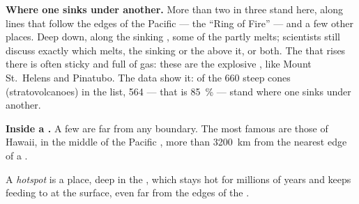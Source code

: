 \textbf{Where one  sinks under another.} More than two  in
three stand here, along lines that follow the edges of the Pacific 
--- the ``Ring of Fire'' --- and a few other places. Deep down, along the
sinking , some of the  partly melts; scientists still discuss
exactly which  melts, the sinking  or the  above it, or both.
The  that rises there is often sticky and full of gas: these are the
explosive , like Mount St.~Helens and Pinatubo. The data show it:
of the 660 steep cones (stratovolcanoes) in the list, 564 --- that is
85~\% --- stand where one  sinks under another.

\textbf{Inside a .} A few  are far from any boundary. The
most famous are those of Hawaii, in the middle of the Pacific , more
than \qty{3200}{km} from the nearest edge of a .

\begin{definition}[Hotspot]\label{def:g7:volcanoes:hotspot}
A \emph{hotspot} is a place, deep in the , which
stays hot for millions of years and keeps feeding  to  at
the surface, even far from the edges of the .
\end{definition}


